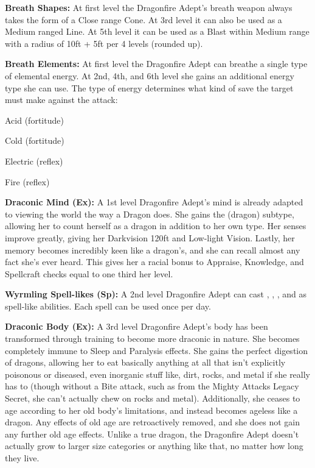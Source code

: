 \textbf{Breath Shapes:} At first level the Dragonfire Adept's breath weapon always takes the form of a Close range Cone. At 3rd level it can also be used as a Medium ranged Line. At 5th level it can be used as a Blast within Medium range with a radius of 10ft + 5ft per 4 levels (rounded up).

\textbf{Breath Elements:} At first level the Dragonfire Adept can breathe a single type of elemental energy. At 2nd, 4th, and 6th level she gains an additional energy type she can use. The type of energy determines what kind of save the target must make against the attack:

\begin{itemize*}
\item Acid (fortitude)
\item Cold (fortitude)
\item Electric (reflex)
\item Fire (reflex)
\end{itemize*}

\textbf{Draconic Mind (Ex):} A 1st level Dragonfire Adept's mind is already adapted to viewing the world the way a Dragon does. She gains the (dragon) subtype, allowing her to count herself as a dragon in addition to her own type. Her senses improve greatly, giving her Darkvision 120ft and Low-light Vision. Lastly, her memory becomes incredibly keen like a dragon's, and she can recall almost any fact she's ever heard. This gives her a racial bonus to Appraise, Knowledge, and Spellcraft checks equal to one third her level.

\textbf{Wyrmling Spell-likes (Sp):} A 2nd level Dragonfire Adept can cast , , , and  as spell-like abilities. Each spell can be used once per day.

\textbf{Draconic Body (Ex):} A 3rd level Dragonfire Adept's body has been transformed through training to become more draconic in nature. She becomes completely immune to Sleep and Paralysis effects. She gains the perfect digestion of dragons, allowing her to eat basically anything at all that isn't explicitly poisonous or diseased, even inorganic stuff like, dirt, rocks, and metal if she really has to (though without a Bite attack, such as from the Mighty Attacks Legacy Secret, she can't actually chew on rocks and metal). Additionally, she ceases to age according to her old body's limitations, and instead becomes ageless like a dragon. Any effects of old age are retroactively removed, and she does not gain any further old age effects. Unlike a true dragon, the Dragonfire Adept doesn't actually grow to larger size categories or anything like that, no matter how long they live.

